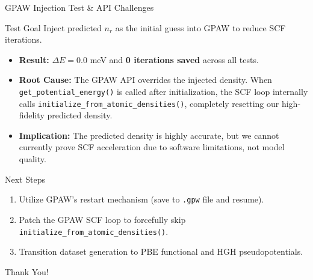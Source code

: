 \documentclass[aspectratio=169]{beamer}
\begin{document}
\begin{frame}{GPAW Injection Test \& API Challenges}
  \begin{alertblock}{Test Goal}
    Inject predicted $n_r$ as the initial guess into GPAW to reduce SCF iterations.
  \end{alertblock}

  \begin{itemize}
      \item \textbf{Result:} $\Delta E = 0.0$ meV and \textbf{0 iterations saved} across all tests.
      \item \textbf{Root Cause:} The GPAW API overrides the injected density. When \texttt{get\_potential\_energy()} is called after initialization, the SCF loop internally calls \texttt{initialize\_from\_atomic\_densities()}, completely resetting our high-fidelity predicted density.
      \item \textbf{Implication:} The predicted density is highly accurate, but we cannot currently prove SCF acceleration due to software limitations, not model quality.
  \end{itemize}
  
  \begin{block}{Next Steps}
    \begin{enumerate}
        \item Utilize GPAW's restart mechanism (save to \texttt{.gpw} file and resume).
        \item Patch the GPAW SCF loop to forcefully skip \texttt{initialize\_from\_atomic\_densities()}.
        \item Transition dataset generation to PBE functional and HGH pseudopotentials.
    \end{enumerate}
  \end{block}
\end{frame}

\begin{frame}
  \begin{center}
    \Huge{Thank You!}
  \end{center}
\end{frame}
\end{document}
